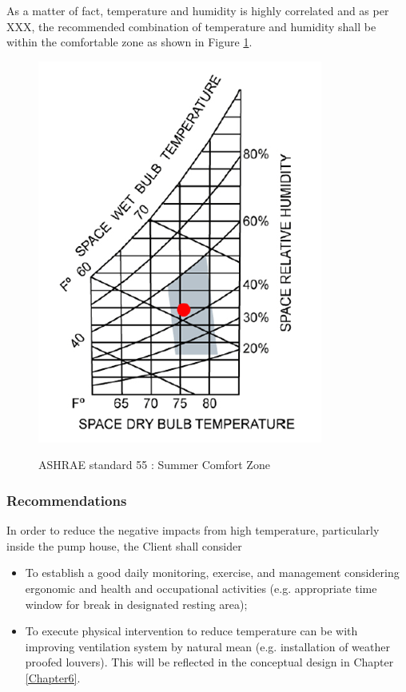 As a matter of fact, temperature and humidity is highly correlated and as per XXX, the recommended combination of temperature and humidity shall be within the comfortable zone as shown in Figure \ref{ch04_fig_wem01}.

\begin{figure}[!htb]
	\includegraphics[scale=2]{figures/ch04_fig_wem01} \\
	\caption{ASHRAE standard 55 : Summer Comfort Zone}
	\label{ch04_fig_wem01} 
\end{figure}

\subsubsection{Recommendations}
In order to reduce the negative impacts from high temperature, particularly inside the pump house, the Client shall consider

\begin{itemize}
	\item To establish a good daily monitoring, exercise, and management considering ergonomic and health and occupational activities (e.g. appropriate time window for break in designated resting area);
	\item To execute physical intervention to reduce temperature can be with improving ventilation system by natural mean (e.g. installation of weather proofed louvers). This will be reflected in the conceptual design in Chapter \ref{Chapter6}.
\end{itemize}


